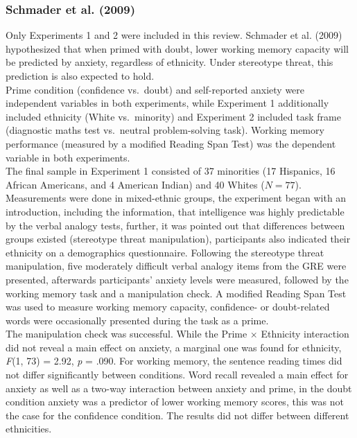 \documentclass[
  stu,floatsintext]{apa7}
\begin{document}
\subsubsection{Schmader et al. (2009)}\label{schmadermetacognitiveperspectivecognitive2009}

Only Experiments 1 and 2 were included in this review.
Schmader et al. (2009) hypothesized that when primed with doubt, lower working memory capacity will be predicted by anxiety, regardless of ethnicity.
Under stereotype threat, this prediction is also expected to hold.\\
Prime condition (confidence vs.~doubt) and self-reported anxiety were independent variables in both experiments, while Experiment 1 additionally included ethnicity (White vs.~minority) and Experiment 2 included task frame (diagnostic maths test vs.~neutral problem-solving task).
Working memory performance (measured by a modified Reading Span Test) was the dependent variable in both experiments.\\
The final sample in Experiment 1 consisted of 37 minorities (17 Hispanics, 16 African Americans, and 4 American Indian) and 40 Whites (\(N = 77\)).
Measurements were done in mixed-ethnic groups, the experiment began with an introduction, including the information, that intelligence was highly predictable by the verbal analogy tests, further, it was pointed out that differences between groups existed (stereotype threat manipulation), participants also indicated their ethnicity on a demographics questionnaire.
Following the stereotype threat manipulation, five moderately difficult verbal analogy items from the GRE were presented, afterwards participants' anxiety levels were measured, followed by the working memory task and a manipulation check.
A modified Reading Span Test was used to measure working memory capacity, confidence- or doubt-related words were occasionally presented during the task as a prime.\\
The manipulation check was successful.
While the Prime \(\times\) Ethnicity interaction did not reveal a main effect on anxiety, a marginal one was found for ethnicity, \emph{F}(1, 73) = 2.92, \emph{p} = .090.
For working memory, the sentence reading times did not differ significantly between conditions.
Word recall revealed a main effect for anxiety as well as a two-way interaction between anxiety and prime, in the doubt condition anxiety was a predictor of lower working memory scores, this was not the case for the confidence condition.
The results did not differ between different ethnicities.\\
\end{document}
